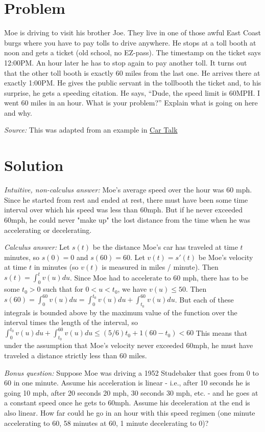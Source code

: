 \documentclass[11pt,a4paper]{report}
\theoremstyle{plain}
\theoremstyle{definition}
\theoremstyle{remark}
\begin{document}
	
\section*{Problem}
Moe is driving to visit his brother Joe.  They live in one of those awful East Coast burgs where you have to pay tolls to drive anywhere.  He stops at a toll booth at noon and gets a ticket (old school, no EZ-pass).  The timestamp on the ticket says 12:00PM.  An hour later he has to stop again to pay another toll.  It turns out that the other toll booth is exactly 60 miles from the last one.  He arrives there at exactly 1:00PM.  He gives the public servant in the tollbooth the ticket and, to his surprise, he gets a speeding citation. He says, “Dude, the speed limit is 60MPH. I went 60 miles in an hour.  What is your problem?”  Explain what is going on here and why.

\textit{Source:} This was adapted from an example in  \href{https://www.cartalk.com}{Car Talk}

\section*{Solution}
\textit{Intuitive, non-calculus answer:} Moe's average speed over the hour was 60 mph.  Since he started from rest and ended at rest, there must have been some time interval over which his speed was less than 60mph.  But if he never exceeded 60mph, he could never "make up" the lost distance from the time when he was accelerating or decelerating.

\textit{Calculus answer: } Let $s(t)$ be the distance Moe's car has traveled at time $t$ minutes, so $s(0) = 0$ and $s(60)= 60$.  Let $v(t) = s'(t)$ be Moe's velocity at time $t$ in minutes (so $v(t)$ is measured in miles / minute).  Then $s(t) = \int_{0}^{t} v(u) du$. Since Moe had to accelerate to 60 mph, there has to be some $t_0>0$ such that for $0 < u < t_0$, we have $v(u) \leq 50$.  Then $s(60) = \int_{0}^{60} v(u) du = \int_{0}^{t_0} v(u) du + \int_{t_0}^{60} v(u) du$.  But each of these integrals is bounded above by the maximum value of the function over the interval times the length of the interval, so $\int_{0}^{t_0} v(u) du + \int_{t_0}^{60} v(u) du \leq (5/6) t_0 + 1(60 - t_0) < 60$ This means that under the assumption that Moe's velocity never exceeded 60mph, he must have traveled a distance strictly less than 60 miles.

\textit{Bonus question: } Suppose Moe was driving a 1952 Studebaker that goes from 0 to 60 in one minute.  Assume his acceleration is linear - i.e., after 10 seconds he is going 10 mph, after 20 seconds 20 mph, 30 seconds 30 mph, etc. - and he goes at a constant speed once he gets to 60mph.  Assume his deceleration at the end is also linear. How far could he go in an hour with this speed regimen (one minute accelerating to 60, 58 minutes at 60, 1 minute decelerating to 0)?
\end{document}
